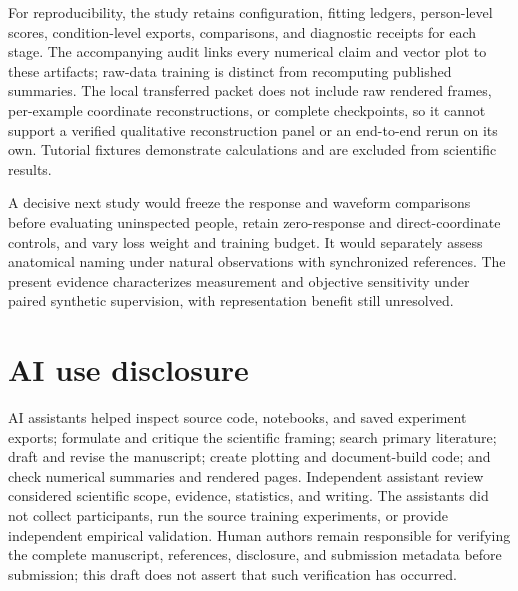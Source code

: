 \documentclass{article}
\begin{document}
For reproducibility, the study retains configuration, fitting ledgers, person-level scores, condition-level exports, comparisons, and diagnostic receipts for each stage. The accompanying audit links every numerical claim and vector plot to these artifacts; raw-data training is distinct from recomputing published summaries. The local transferred packet does not include raw rendered frames, per-example coordinate reconstructions, or complete checkpoints, so it cannot support a verified qualitative reconstruction panel or an end-to-end rerun on its own. Tutorial fixtures demonstrate calculations and are excluded from scientific results.

A decisive next study would freeze the response and waveform comparisons before evaluating uninspected people, retain zero-response and direct-coordinate controls, and vary loss weight and training budget. It would separately assess anatomical naming under natural observations with synchronized references. The present evidence characterizes measurement and objective sensitivity under paired synthetic supervision, with representation benefit still unresolved.

\clearpage
\section*{AI use disclosure}
AI assistants helped inspect source code, notebooks, and saved experiment exports; formulate and critique the scientific framing; search primary literature; draft and revise the manuscript; create plotting and document-build code; and check numerical summaries and rendered pages. Independent assistant review considered scientific scope, evidence, statistics, and writing. The assistants did not collect participants, run the source training experiments, or provide independent empirical validation. Human authors remain responsible for verifying the complete manuscript, references, disclosure, and submission metadata before submission; this draft does not assert that such verification has occurred.


\end{document}
